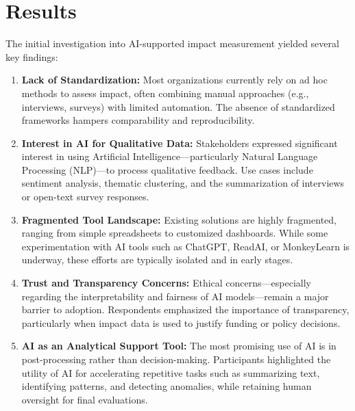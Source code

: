 

\chapter{Results}

The initial investigation into AI-supported impact measurement yielded several key findings:

\begin{enumerate}

 \item \textbf{Lack of Standardization:} Most organizations currently rely on ad hoc methods to assess impact, often combining manual approaches (e.g., interviews, surveys) with limited automation. The absence of standardized frameworks hampers comparability and reproducibility.

 \item \textbf{Interest in AI for Qualitative Data:} Stakeholders expressed significant interest in using Artificial Intelligence—particularly Natural Language Processing (NLP)—to process qualitative feedback. Use cases include sentiment analysis, thematic clustering, and the summarization of interviews or open-text survey responses.


\item \textbf{Fragmented Tool Landscape:} Existing solutions are highly fragmented, ranging from simple spreadsheets to customized dashboards. While some experimentation with AI tools such as ChatGPT, ReadAI, or MonkeyLearn is underway, these efforts are typically isolated and in early stages.

\item \textbf{Trust and Transparency Concerns:} Ethical concerns—especially regarding the interpretability and fairness of AI models—remain a major barrier to adoption. Respondents emphasized the importance of transparency, particularly when impact data is used to justify funding or policy decisions.

\item \textbf{AI as an Analytical Support Tool:} The most promising use of AI is in post-processing rather than decision-making. Participants highlighted the utility of AI for accelerating repetitive tasks such as summarizing text, identifying patterns, and detecting anomalies, while retaining human oversight for final evaluations.


\end{enumerate}
